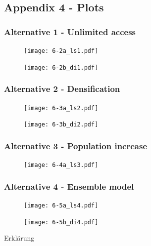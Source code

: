\documentclass[10pt]{article}
\begin{document}
\onecolumn
\subsection{Appendix 4 - Plots}
\subsubsection{Alternative 1 - Unlimited access}
\begin{figure}[ht!]
\texttt{[image: 6-2a\_ls1.pdf]}
\end{figure}

\begin{figure}[hb!]
\texttt{[image: 6-2b\_di1.pdf]}
\end{figure}

\newpage

\subsubsection{Alternative 2 - Densification}
\begin{figure}[ht!]
\texttt{[image: 6-3a\_ls2.pdf]}
\end{figure}

\begin{figure}[hb!]
\texttt{[image: 6-3b\_di2.pdf]}
\end{figure}

\newpage

\subsubsection{Alternative 3 - Population increase}
\begin{figure}[ht!]
\texttt{[image: 6-4a\_ls3.pdf]}
\end{figure}

\newpage

\subsubsection{Alternative 4 - Ensemble model}
\begin{figure}[ht!]
\texttt{[image: 6-5a\_ls4.pdf]}
\end{figure}

\begin{figure}[hb!]
\texttt{[image: 6-5b\_di4.pdf]}
\end{figure}

\newpage

\large{Erkl\"arung}
\end{document}
